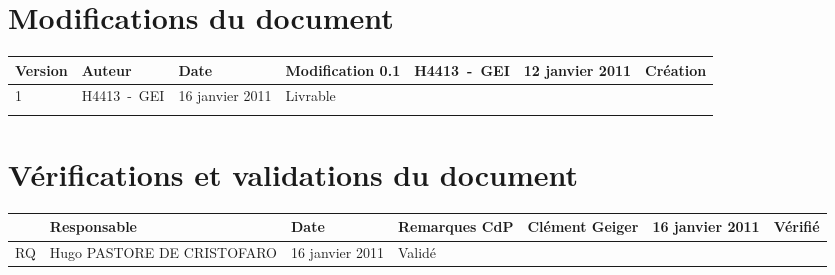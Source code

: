 
\section*{Modifications du document}

\begin{center}
\begin{longtable}{|m{14mm}||m{36mm}|m{36mm}|m{60mm}|}
\hline
Version & Auteur & Date & Modification\endhead \hline
0.1
& %
H4413~-~GEI
& %
12 janvier 2011
& %
Création
\\\hline
1
& %
H4413~-~GEI
& %
16 janvier 2011
& %
Livrable
\\\hline

& %

& %

& %

\\\hline
\end{longtable}
\end{center}


\section*{Vérifications et validations du document}

\begin{center}
\begin{longtable}{|m{15mm}|m{36mm}|m{36mm}|m{60mm}|}
\hline
 & Responsable & Date & Remarques\endhead \hline
CdP
& %
Clément Geiger
& %
16 janvier 2011
& %
Vérifié
\\\hline
RQ
& %
Hugo PASTORE DE CRISTOFARO
& %
16 janvier 2011
& %
Validé
\\\hline
\end{longtable}
\end{center}

\pagebreak
